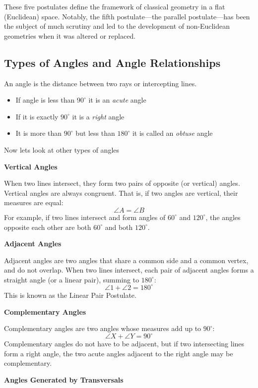 These five postulates define the framework of classical geometry in a flat (Euclidean) space. Notably, the fifth postulate—the parallel postulate—has been the subject of much scrutiny and led to the development of non-Euclidean geometries when it was altered or replaced.

\subsection{Types of Angles and Angle Relationships}

An angle is the distance between two rays or intercepting lines.

\begin{itemize}[label=\(-\)]
	\item If angle is less than \(90^\circ\) it is an \emph{acute} angle
	\item If it is exactly \(90^\circ\) it is a \emph{right} angle
	\item It is more than \(90^\circ\) but less than \(180^\circ\) it is called an \emph{obtuse} angle
\end{itemize}

Now lets look at other types of angles

\textbf{Vertical Angles}

When two lines intersect, they form two pairs of opposite (or vertical) angles. Vertical angles are always congruent. That is, if two angles are vertical, their measures are equal:
\[
\angle A = \angle B
\]
For example, if two lines intersect and form angles of \( 60^\circ \) and \( 120^\circ \), the angles opposite each other are both \( 60^\circ \) and both \( 120^\circ \).

\textbf{Adjacent Angles}

Adjacent angles are two angles that share a common side and a common vertex, and do not overlap. When two lines intersect, each pair of adjacent angles forms a straight angle (or a linear pair), summing to \(180^\circ\):
\[
\angle 1 + \angle 2 = 180^\circ
\]
This is known as the Linear Pair Postulate.

\textbf{Complementary Angles}

Complementary angles are two angles whose measures add up to \(90^\circ\):
\[
\angle X + \angle Y = 90^\circ
\]
Complementary angles do not have to be adjacent, but if two intersecting lines form a right angle, the two acute angles adjacent to the right angle may be complementary.

\textbf{Angles Generated by Transversals}

